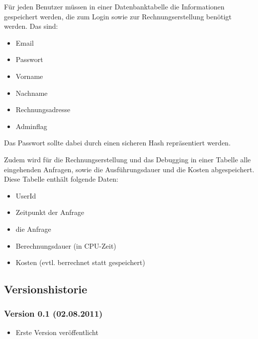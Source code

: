 \documentclass[ngerman]{scrartcl}
\begin{document}
	Für jeden Benutzer müssen in einer Datenbanktabelle die Informationen gespeichert werden, die zum Login sowie zur Rechnungserstellung benötigt werden. 
	Das sind:
	
	\begin{itemize}
		\item Email
		\item Passwort
		\item Vorname
		\item Nachname
		\item Rechnungsadresse
		\item Adminflag
	\end{itemize}
	
	Das Passwort sollte dabei durch einen sicheren Hash repräsentiert werden.
	
	Zudem wird für die Rechnungserstellung und das Debugging in einer Tabelle alle eingehenden Anfragen, sowie die Ausführungsdauer und die Kosten abgespeichert.
	Diese Tabelle enthält folgende Daten:
	
	\begin{itemize}
		\item UserId
		\item Zeitpunkt der Anfrage
		\item die Anfrage
		\item Berechnungsdauer (in CPU-Zeit)
		\item Kosten (evtl. berrechnet statt gespeichert)
	\end{itemize}	

	\subsection{Versionshistorie}
	
	\subsubsection*{Version 0.1 (02.08.2011)}

	\begin{itemize}
		\item Erste Version veröffentlicht
	\end{itemize}
\end{document}
